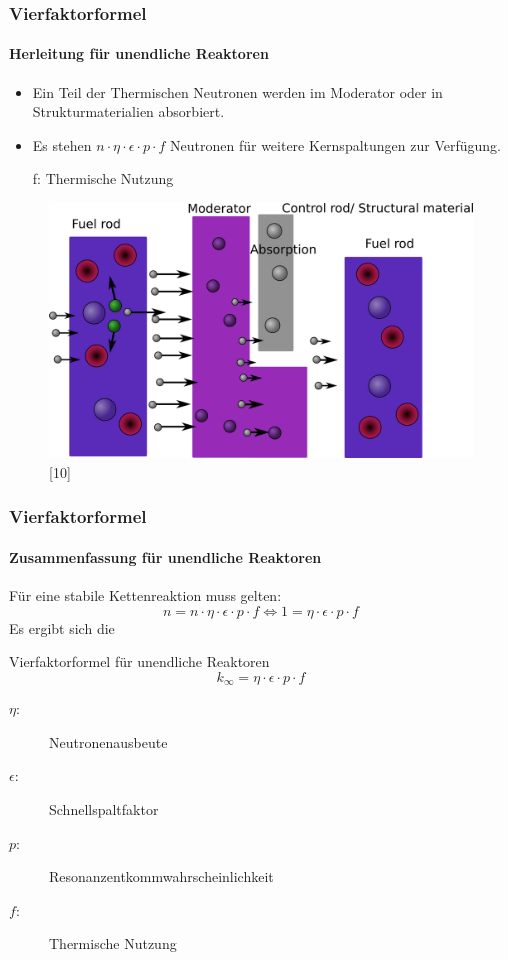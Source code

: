 \documentclass{beamer}[9pt]
\begin{document}
\begin{frame}
\frametitle{Vierfaktorformel}
\framesubtitle{Herleitung für unendliche Reaktoren}
\begin{itemize}
\item Ein Teil der Thermischen Neutronen werden im Moderator oder in Strukturmaterialien absorbiert.
\item Es stehen  $n\cdot\eta\cdot\epsilon\cdot p\cdot f$ Neutronen für weitere Kernspaltungen zur Verfügung.
\item[f: ]Thermische Nutzung
\end{itemize}

\begin{figure}
\centering
\includegraphics[scale=.15]{thermal_reactor_full.png}[10]
\end{figure}
\end{frame}

\begin{frame}
\frametitle{Vierfaktorformel}
\framesubtitle{Zusammenfassung für unendliche Reaktoren}
Für eine stabile Kettenreaktion muss gelten:
\[
n = n\cdot\eta\cdot\epsilon\cdot p\cdot f \Leftrightarrow 1 = \eta\cdot\epsilon\cdot p\cdot f 
\]
Es ergibt sich die
\begin{block}{Vierfaktorformel für unendliche Reaktoren}
\[
k_\infty =  \eta\cdot\epsilon\cdot p\cdot f
\]
\begin{description}
\item[$\eta$:] Neutronenausbeute
\item[$\epsilon$:] Schnellspaltfaktor
\item[$p$:] Resonanzentkommwahrscheinlichkeit
\item[$f$:] Thermische Nutzung
\end{description}

\end{block}
\end{frame}
\end{document}
